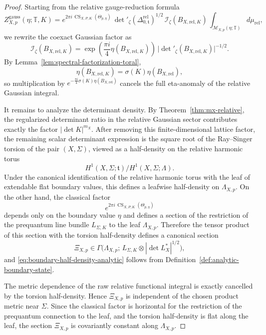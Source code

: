 \documentclass[12pt]{amsart}
\numberwithin{equation}{section}
\newcommand{\CS}{\operatorname{CS}}
\begin{document}
\begin{proof}
Starting from the relative gauge-reduction formula
\[
Z^{\mathrm{gauss}}_{X,p}(\eta;\mathbb T,K)
=
e^{2\pi i\,\CS_{X,P,K}(\Theta_{p,\eta})}\,
\det\nolimits'_{\zeta}(\Delta^{\mathrm{rel}}_{0,\mathfrak t})^{1/2}\,
\mathcal I_{\zeta}(B_{X,\mathrm{rel},K})\,
\int_{\mathcal M_{X,p}(\eta;\mathbb T)} d\mu_{\mathrm{rel}},
\]
we rewrite the coexact Gaussian factor as
\[
\mathcal I_{\zeta}(B_{X,\mathrm{rel},K})
=
\exp\!\left(\frac{\pi i}{4}\eta(B_{X,\mathrm{rel},K})\right)\,
\bigl|\det\nolimits'_{\zeta}(B_{X,\mathrm{rel},K})\bigr|^{-1/2}.
\]
By Lemma~\ref{lem:spectral-factorization-toral},
\[
\eta(B_{X,\mathrm{rel},K})=\sigma(K)\eta(B_{X,\mathrm{rel}}),
\]
so multiplication by $e^{-\frac{\pi i}{4}\sigma(K)\eta(B_{X,\mathrm{rel}})}$ cancels the full eta-anomaly of the relative Gaussian integral.

It remains to analyze the determinant density. By Theorem~\ref{thm:mx-relative}, the
regularized determinant ratio in the relative Gaussian sector contributes exactly the factor $|\det K|^{m_X}.$
After removing this finite-dimensional lattice factor, the remaining scalar determinant
expression is the square root of the Ray--Singer torsion of the pair \((X,\Sigma)\), viewed as
a half-density on the relative harmonic torus
\[
H^1(X,\Sigma;\mathfrak t)/H^1(X,\Sigma;\Lambda).
\]
 Under the canonical identification of the relative harmonic
torus with the leaf of extendable flat boundary values, this defines a leafwise half-density on
\(\Lambda_{X,p}\). On the other hand, the classical factor
\[
e^{2\pi i\,\CS_{X,P,K}(\Theta_{p,\eta})}
\]
depends only on the boundary value \(\eta\) and defines a section of the restriction of the
prequantum line bundle \(L_{\Sigma,K}\) to the leaf \(\Lambda_{X,p}\). Therefore the tensor
product of this section with the torsion half-density defines a canonical section
\[
\Xi_{X,p}\in
\Gamma\!\bigl(
\Lambda_{X,p};\,L_{\Sigma,K}\otimes |\det L_X^*|^{1/2}
\bigr),
\]
and \eqref{eq:boundary-half-density-analytic} follows from Definition~\ref{def:analytic-boundary-state}.

The metric dependence of the raw relative functional integral is exactly cancelled by the
torsion half-density. Hence \(\Xi_{X,p}\) is
independent of the chosen product metric near \(\Sigma\). Since the classical factor is horizontal for the restriction of the prequantum connection
to the leaf, and the torsion half-density is flat along the leaf, the section \(\Xi_{X,p}\)
is covariantly constant along \(\Lambda_{X,p}\).
\end{proof}
\end{document}
